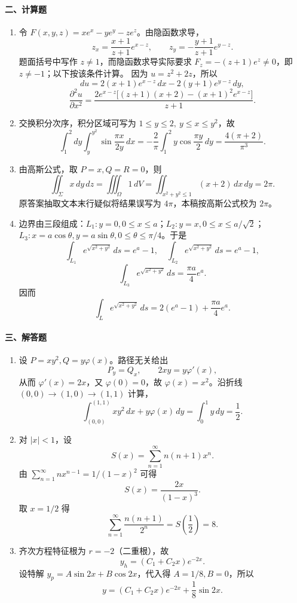 \paragraph*{二、计算题}
\begin{enumerate}
  \item 令 $F(x,y,z)=xe^x-ye^y-ze^z$。由隐函数求导，
  \[
    z_x=\frac{x+1}{z+1}e^{x-z},\qquad
    z_y=-\frac{y+1}{z+1}e^{y-z}.
  \]
  题面括号中写作 $z\ne 1$，而隐函数求导实际要求 $F_z=-(z+1)e^z\ne0$，即 $z\ne-1$；以下按该条件计算。
  因为 $u=z^2+2z$，所以
  \[
    du=2(x+1)e^{x-z}\,dx-2(y+1)e^{y-z}\,dy,
  \]
  \[
    \frac{\partial^2u}{\partial x^2}
    =
    \frac{2e^{x-z}\bigl[(z+1)(x+2)-(x+1)^2e^{x-z}\bigr]}{z+1}.
  \]
  \item 交换积分次序，积分区域可写为 $1\le y\le 2,\ y\le x\le y^2$，故
  \[
    \int_1^2 dy\int_y^{y^2}\sin\frac{\pi x}{2y}\,dx
    =-\frac{2}{\pi}\int_1^2 y\cos\frac{\pi y}{2}\,dy
    =\frac{4(\pi+2)}{\pi^3}.
  \]
  \item 由高斯公式，取 $P=x,Q=R=0$，则
  \[
    \iint_\Sigma x\,dy\,dz=\iiint_\Omega 1\,dV
    =\iint_{x^2+y^2\le 1}(x+2)\,dx\,dy=2\pi.
  \]
  原答案抽取文本末行疑似将结果误写为 $4\pi$，本稿按高斯公式校为 $2\pi$。
  \item 边界由三段组成：$L_1:y=0,0\le x\le a$；$L_2:y=x,0\le x\le a/\sqrt2$；$L_3:x=a\cos\theta,y=a\sin\theta,0\le\theta\le\pi/4$。于是
  \[
    \int_{L_1}e^{\sqrt{x^2+y^2}}\,ds=e^a-1,\quad
    \int_{L_2}e^{\sqrt{x^2+y^2}}\,ds=e^a-1,
  \]
  \[
    \int_{L_3}e^{\sqrt{x^2+y^2}}\,ds=\frac{\pi a}{4}e^a.
  \]
  因而
  \[
    \int_L e^{\sqrt{x^2+y^2}}\,ds=2(e^a-1)+\frac{\pi a}{4}e^a.
  \]
\end{enumerate}

\paragraph*{三、解答题}
\begin{enumerate}
  \item 设 $P=xy^2,Q=y\varphi(x)$。路径无关给出
  \[
    P_y=Q_x,\qquad 2xy=y\varphi'(x),
  \]
  从而 $\varphi'(x)=2x$，又 $\varphi(0)=0$，故 $\varphi(x)=x^2$。沿折线 $(0,0)\to(1,0)\to(1,1)$ 计算，
  \[
    \int_{(0,0)}^{(1,1)} xy^2\,dx+y\varphi(x)\,dy
    =\int_0^1 y\,dy=\frac12.
  \]
  \item 对 $|x|<1$，设
  \[
    S(x)=\sum_{n=1}^\infty n(n+1)x^n.
  \]
  由 $\sum_{n=1}^\infty nx^{n-1}=1/(1-x)^2$ 可得
  \[
    S(x)=\frac{2x}{(1-x)^3}.
  \]
  取 $x=1/2$ 得
  \[
    \sum_{n=1}^\infty \frac{n(n+1)}{2^n}=S\left(\frac12\right)=8.
  \]
  \item 齐次方程特征根为 $r=-2$（二重根），故
  \[
    y_h=(C_1+C_2x)e^{-2x}.
  \]
  设特解 $y_p=A\sin 2x+B\cos 2x$，代入得 $A=1/8,B=0$，所以
  \[
    y=(C_1+C_2x)e^{-2x}+\frac18\sin 2x.
  \]
\end{enumerate}

